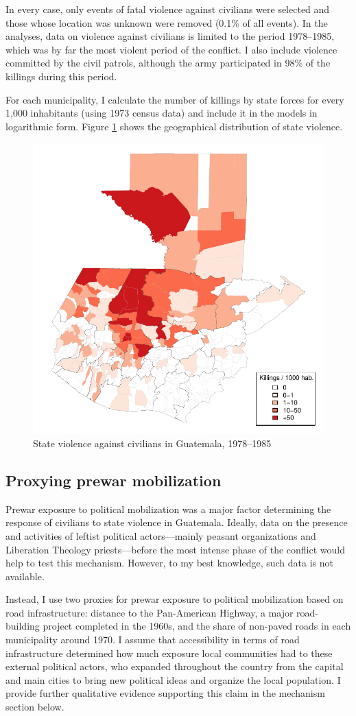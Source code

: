 \documentclass[12pt, notitlepage]{article}
\begin{document}
In every case, only events of fatal violence against civilians were selected and those whose location was unknown were removed (0.1\% of all events).
In the analyses, data on violence against civilians is limited to the period 1978--1985, which was by far the most violent period of the conflict.%
I also include violence committed by the civil patrols, although the army participated in 98\% of the killings during this period.

For each municipality, I calculate the number of killings by state forces for every 1,000 inhabitants (using 1973 census data) and include it in the models in logarithmic form.
Figure \ref{fig:map_govt_vi} shows the geographical distribution of state violence.

\begin{figure}[htb!]
  \centering
    \includegraphics[width = .4\textwidth]{img/map_govt_vi}

  \caption{State violence against civilians in Guatemala, 1978--1985} \label{fig:map_govt_vi}

\end{figure}

\subsection*{Proxying prewar mobilization}

Prewar exposure to political mobilization was a major factor determining the response of civilians to state violence in Guatemala.
Ideally, data on the presence and activities of leftist political actors---mainly peasant organizations and Liberation Theology priests---before the most intense phase of the conflict would help to test this mechanism.
However, to my best knowledge, such data is not available.

Instead, I use two proxies for prewar exposure to political mobilization based on road infrastructure: distance to the Pan-American Highway, a major road-building project completed in the 1960s, and the share of non-paved roads in each municipality around 1970.
I assume that accessibility in terms of road infrastructure determined how much exposure local communities had to these external political actors, who expanded throughout the country from the capital and main cities to bring new political ideas and organize the local population.
I provide further qualitative evidence supporting this claim in the mechanism section below.
\end{document}
